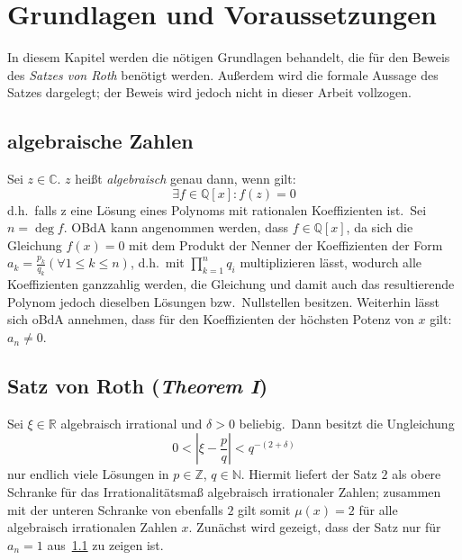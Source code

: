 
\section{Grundlagen und Voraussetzungen}
    \label{sec:basics}
    \textrm{In diesem Kapitel werden die nötigen Grundlagen behandelt, die für den Beweis des \emph{Satzes von Roth}
    benötigt werden. Außerdem wird die formale Aussage des Satzes dargelegt; der Beweis wird jedoch nicht in dieser
    Arbeit vollzogen.}
    
    \subsection{algebraische Zahlen}
        \label{subsec:algebraic-numbers}
        \textrm{Sei $z \in \mathbb{C}$. $z$ heißt \emph{algebraisch} genau dann, wenn gilt:}
        \begin{equation}
            \exists f \in \mathbb{Q}[x] : f(z) = 0 \label{eq:def-algebraic}
        \end{equation}
        \textrm{d.h.\ falls z eine Lösung eines Polynoms mit rationalen Koeffizienten ist.\ Sei $n = \deg f$. OBdA kann
        angenommen werden, dass $f \in \mathbb{Q}[x]$, da sich die Gleichung $f(x) = 0$ mit dem Produkt der Nenner der
        Koeffizienten der Form $a_k = \frac{p_k}{q_k} (\forall 1 \leq k \leq n)$, d.h.\ mit $\prod_{k=1}^n q_i$
        multiplizieren lässt, wodurch alle Koeffizienten ganzzahlig werden, die Gleichung und damit auch das
        resultierende Polynom jedoch dieselben Lösungen bzw.\ Nullstellen besitzen.
        \newline
        Weiterhin lässt sich oBdA annehmen, dass für den Koeffizienten der höchsten Potenz von $x$ gilt: $a_n \neq 0$.}
    
    \subsection{Satz von Roth (\emph{Theorem I})}
        \label{subsec:th1}
        Sei $\xi \in \mathbb{R}$ algebraisch irrational und $\delta > 0$ beliebig.\ Dann besitzt die Ungleichung
        \begin{equation}
            0 < \left| \xi - \frac{p}{q} \right| < q^{-(2+\delta)} \label{eq:svr}
        \end{equation}
        \textrm{nur endlich viele Lösungen in $p \in \mathbb{Z}$, $q \in \mathbb{N}$.
        \newline
        \textrm{Hiermit liefert der Satz $2$ als obere Schranke für das Irrationalitätsmaß algebraisch irrationaler
        Zahlen; zusammen mit der unteren Schranke von ebenfalls $2$ gilt somit $\mu(x) = 2$ für alle algebraisch
        irrationalen Zahlen $x$.}
        \newline \newline
        Zunächst wird gezeigt, dass der Satz nur für $a_n = 1$ aus~\ref{subsec:algebraic-numbers} zu zeigen ist.}
    
